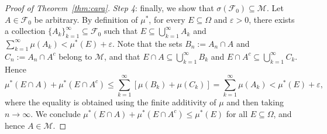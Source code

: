 \begin{proof}[Proof of Theorem~\ref{thm:cara}]
    \emph{Step 4}: finally, we show that $\sigma(\mathcal{F}_0)\subseteq\mathcal{M}$. Let $A\in\mathcal{F}_0$ be arbitrary. By definition of $\mu^*$, for every $E\subseteq\Omega$ and $\varepsilon>0$, there exists a collection $\{A_k\}_{k=1}^\infty\subseteq\mathcal{F}_0$ such that $E\subseteq\bigcup_{k=1}^\infty A_k$ and $\sum_{k=1}^\infty\mu(A_k)<\mu^*(E)+\varepsilon$. Note that the sets $B_n:=A_n\cap A$ and $C_n:=A_n\cap A^c$ belong to $\mathcal{M}$, and that $E\cap A\subseteq\bigcup_{k=1}^\infty B_k$ and $E\cap A^c\subseteq\bigcup_{k=1}^\infty C_k$. Hence
    \begin{equation*}
        \mu^*(E\cap A)+\mu^*(E\cap A^c) \le \sum_{k=1}^\infty [\mu(B_k)+\mu(C_k)] = \sum_{k=1}^\infty \mu(A_k) < \mu^*(E)+\varepsilon,
    \end{equation*}
    where the equality is obtained using the finite additivity of $\mu$ and then taking $n\to\infty$. We conclude $\mu^*(E\cap A)+\mu^*(E\cap A^c)\le \mu^*(E)$ for all $E\subseteq\Omega$, and hence $A\in\mathcal{M}$.
\end{proof}



